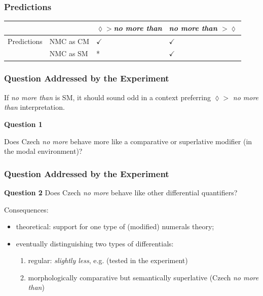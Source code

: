 \documentclass[10pt
]{beamer}
\begin{document}
\begin{frame}
  \frametitle{Predictions}

  \begin{longtable}[]{@{}llll@{}}
    \toprule
    & & $\lozenge >$\textit{no more than} & \textit{no more than} $> \lozenge$ \\
    \midrule
    \endhead
    Predictions & NMC as CM & \(\checkmark\) & \(\checkmark\) \\
    & NMC as SM & * & \(\checkmark\) \\
    \bottomrule
    \end{longtable}
  

\end{frame}

\begin{frame}
  \frametitle{Question Addressed by the Experiment}

  \ex If \textit{no more than} is SM, it should sound odd in a context preferring $\lozenge > $ \textit{no more than} interpretation.
  \xe

  \textbf{Question 1}

  \ex Does Czech \textit{no more} behave more like a comparative or superlative modifier (in the modal environment)?
  \xe


\end{frame}

\begin{frame}
  \frametitle{Question Addressed by the Experiment}


  \textbf{Question 2}
\ex Does Czech \textit{no more} behave like other differential quantifiers?
\xe

Consequences:

\begin{itemize}
  \item theoretical: support for one type of (modified) numerals theory;
  \item eventually distinguishing two types of differentials:
    \begin{enumerate}
      \item regular: \textit{slightly less}, e.g. (tested in the experiment)
      \item morphologically comparative but semantically superlative (Czech \textit{no more than})
    \end{enumerate}  
\end{itemize}

  

\end{frame}
\end{document}
